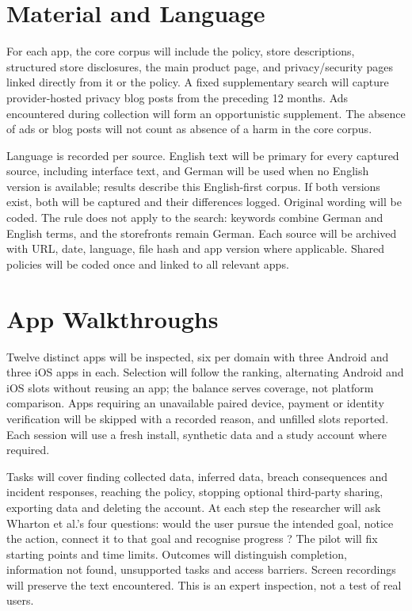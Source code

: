 \section{Material and Language} For each app, the core corpus will include
the policy, store descriptions, structured store disclosures, the main product
page, and privacy/security pages linked directly from it or the policy. A
fixed supplementary search will capture provider-hosted privacy blog posts
from the preceding 12 months. Ads encountered during collection will form an
opportunistic supplement. The absence of ads or blog posts will not count as
absence of a harm in the core corpus.

Language is recorded per source. English text will be primary for every
captured source, including interface text, and German will be used when no
English version is available; results describe this English-first corpus. If
both versions exist, both will be captured and their differences logged.
Original wording will be coded. The rule does not apply to the search:
keywords combine German and English terms, and the storefronts remain German.
Each source will be archived with URL, date, language, file hash and app
version where applicable. Shared policies will be coded
once and linked to all relevant apps.

\section{App Walkthroughs} Twelve distinct apps will be inspected, six per domain
with three Android and three iOS apps in each. Selection will follow the
ranking, alternating Android and iOS slots without reusing an app; the balance
serves coverage, not platform comparison. Apps requiring an unavailable paired
device, payment or identity verification will be skipped with a recorded
reason, and unfilled slots reported. Each session will use a fresh install,
synthetic data and a study account where required.

Tasks will cover finding collected data, inferred data, breach consequences
and incident responses, reaching the policy, stopping optional third-party
sharing, exporting data and deleting the account. At each step the researcher
will ask Wharton et al.'s four questions: would the user pursue the intended
goal, notice the action, connect it to that goal and recognise progress
\parencite{wharton1994cognitive}? The pilot will fix starting points and
time limits. Outcomes will distinguish completion, information not found,
unsupported tasks and access barriers. Screen recordings will preserve the
text encountered. This is an expert inspection, not a test of real users.

